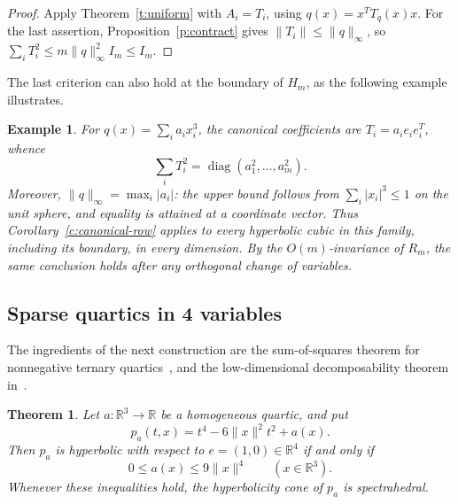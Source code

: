 \documentclass[11pt,onecolumn]{article}
\theoremstyle{blueplain}
\newtheorem{theorem}{Theorem}[section]
\theoremstyle{bluedefinition}
\newtheorem{example}[example]{Example}
\theoremstyle{bluedefinition}
\newcommand{\R}{\mathbb R}
\begin{document}
\begin{proof}
Apply Theorem~\ref{t:uniform} with $A_i=T_i$, using
$q(x)=x^TT_q(x)x$. For the last assertion,
Proposition~\ref{p:contract} gives $\|T_i\|\leqslant\|q\|_\infty$, so
\(
\sum_iT_i^2\leqslant m\|q\|_\infty^2I_m\leqslant I_m.
\)
\end{proof}

The last criterion can also hold at the  boundary of $H_m$, as the following example illustrates.
\begin{example}\label{ex:diagonal-row}
For $q(x)=\sum_i a_i x_i^3$, the canonical coefficients are
$T_i=a_i e_ie_i^T$, whence
\[
\sum_iT_i^2=\operatorname{diag}(a_1^2,\ldots,a_m^2).
\]
Moreover, $\|q\|_\infty=\max_i|a_i|$: the upper bound follows from
$\sum_i|x_i|^3\leqslant1$ on the unit sphere, and equality is attained
at a coordinate vector. Thus Corollary~\ref{c:canonical-row} applies to
every hyperbolic cubic in this family, including its boundary, in every
dimension. By the $O(m)$-invariance of $R_m$, the same conclusion holds
after any orthogonal change of variables.
\end{example}

\subsection{Sparse quartics in 4 variables}

The ingredients of the next construction are the sum-of-squares theorem
for nonnegative ternary quartics~\cite{Hilbert}, and the low-dimensional
decomposability theorem in~\cite{Woronowicz}. 

\begin{theorem}\label{t:quartic}
Let $a\colon \R^3\to\R$ be a homogeneous quartic, and put
\[
p_a(t,x)=t^4-6\|x\|^2t^2+a(x).
\]
Then $p_a$ is hyperbolic with respect to $e=(1,0)\in\R^4$ if and only if
\begin{equation}\label{eq:quartic-bound}
0\leqslant a(x)\leqslant9\|x\|^4\qquad(x\in\R^3).
\end{equation}
Whenever these inequalities hold, the hyperbolicity cone of $p_a$ is
spectrahedral.
\end{theorem}
\end{document}
